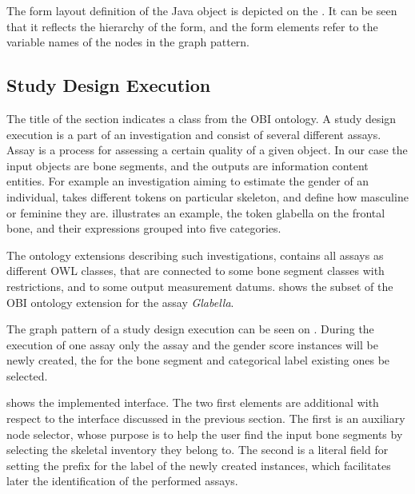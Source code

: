 
The form layout definition of the Java object is depicted on the . It can be seen that it reflects the hierarchy of the form, and the form elements refer to the variable names of the nodes in the graph pattern.


\subsection{Study Design Execution} \label{43}

The title of the section indicates a class from the OBI ontology. A study design execution is a part of an investigation and consist of several different assays. Assay is a process for assessing a certain quality of a given object. In our case the input objects are bone segments, and the outputs are information content entities. For example an investigation aiming to estimate the gender of an individual, takes different tokens on particular skeleton, and define how masculine or feminine they are.  illustrates an example, the token glabella on the frontal bone, and their expressions grouped into five categories.



The ontology extensions describing such investigations, contains all assays as different OWL classes, that are connected to some bone segment classes with restrictions, and to some output measurement datums.  shows the subset of the OBI ontology extension for the assay \textit{Glabella}. 


The graph pattern of a study design execution can be seen on . During the execution of one assay only the assay and the gender score instances will be newly created, the for the bone segment and categorical label existing ones be selected. 


 shows the implemented interface. The two first elements are additional with respect to the interface discussed in the previous section. The first is an auxiliary node selector, whose purpose is to help the user find the input bone segments by selecting the skeletal inventory they belong to. The second is a literal field for setting the prefix for the label of the newly created instances, which facilitates later the identification of the performed assays.

